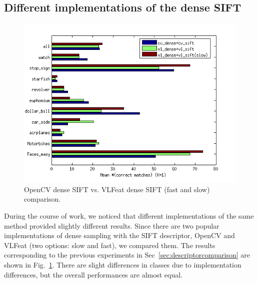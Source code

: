 \documentclass[10pt,journal,cspaper,compsoc]{IEEEtran}
\begin{document}
\subsection{Different implementations of the dense {SIFT}}
%
%
\begin{figure}[h]
  \begin{center}
    \includegraphics[width=0.9\linewidth]{resources/antti_results/fast_VS_slow_vlfeat/metaPar_NumOfMatchAvgMean.png}
\caption{OpenCV dense SIFT vs. VLFeat dense SIFT (fast and slow) comparison.
\label{fig:densecomparison}}
\end{center}
\end{figure}
%
During the course of work, we noticed that different implementations
of the same method provided slightly different results. Since there are two
popular implementations of dense sampling with the SIFT descriptor,
OpenCV and VLFeat (two options: slow and fast), we compared them.
The results corresponding to the previous experiments in 
Sec~\ref{sec:descriptorcomparison}
are shown in Fig.~\ref{fig:densecomparison}. 
There are slight differences in classes due to implementation
differences, but the overall performances are almost equal.

%
\end{document}
